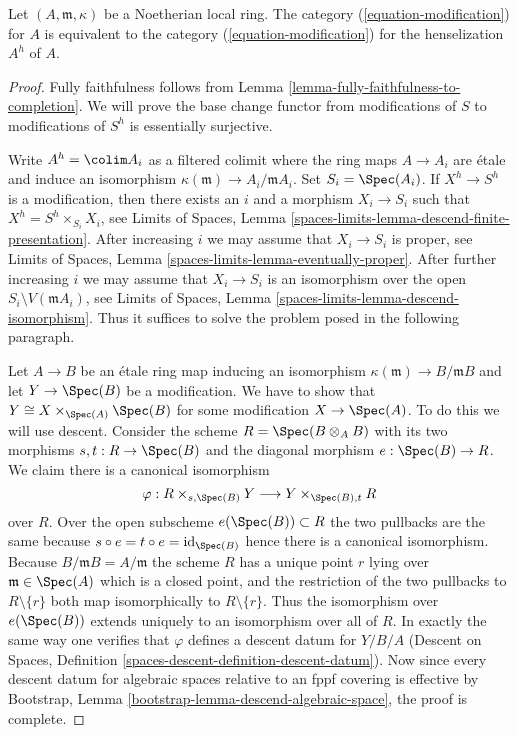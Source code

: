 \begin{lemma}
\label{lemma-henselian}
Let $(A, \mathfrak m, \kappa)$ be a Noetherian local ring.
The category (\ref{equation-modification}) for $A$
is equivalent to the category (\ref{equation-modification})
for the henselization $A^h$ of $A$.
\end{lemma}

\begin{proof}
Fully faithfulness follows from
Lemma \ref{lemma-fully-faithfulness-to-completion}.
We will prove the base change functor from modifications of $S$ to
modifications of $S^h$ is essentially surjective.

\medskip\noindent
Write $A^h = \colim A_i$ as a filtered colimit where the ring maps
$A \to A_i$ are \'etale and induce an isomorphism
$\kappa(\mathfrak m) \to A_i/\mathfrak m A_i$. Set $S_i = \Spec(A_i)$.
If $X^h \to S^h$ is a modification, then there exists an $i$ and
a morphism $X_i \to S_i$ such that $X^h = S^h \times_{S_i} X_i$, see
Limits of Spaces, Lemma \ref{spaces-limits-lemma-descend-finite-presentation}.
After increasing $i$ we may assume that $X_i \to S_i$ is
proper, see
Limits of Spaces, Lemma \ref{spaces-limits-lemma-eventually-proper}.
After further increasing $i$ we may assume that
$X_i \to S_i$ is an isomorphism over the open
$S_i \setminus V(\mathfrak m A_i)$, see
Limits of Spaces, Lemma \ref{spaces-limits-lemma-descend-isomorphism}.
Thus it suffices to solve the problem posed in the following paragraph.

\medskip\noindent
Let $A \to B$ be an \'etale ring map inducing an isomorphism
$\kappa(\mathfrak m) \to B/\mathfrak m B$ and let $Y \to \Spec(B)$
be a modification. We have to show that $Y \cong X \times_{\Spec(A)} \Spec(B)$
for some modification $X \to \Spec(A)$. To do this we will use descent.
Consider the scheme $R = \Spec(B \otimes_A B)$ with its two morphisms
$s, t : R \to \Spec(B)$ and the diagonal morphism $e : \Spec(B) \to R$.
We claim there is a canonical isomorphism
$$
\varphi :
R \times_{s, \Spec(B)} Y
\longrightarrow
Y \times_{\Spec(B), t} R
$$
over $R$. Over the open subscheme $e(\Spec(B)) \subset R$ the two
pullbacks are the same because $s \circ e = t \circ e = \text{id}_{\Spec(B)}$
hence there is a canonical isomorphism. Because
$B/\mathfrak m B = A/\mathfrak m$ the scheme $R$ has a unique
point $r$ lying over $\mathfrak m \in \Spec(A)$ which is a closed point,
and the restriction of the two pullbacks to $R \setminus \{r\}$ both map
isomorphically to $R \setminus \{r\}$. Thus the isomorphism over
$e(\Spec(B))$ extends uniquely to an isomorphism over all of $R$.
In exactly the same way one verifies that $\varphi$ defines a descent
datum for $Y/B/A$ (Descent on Spaces, Definition
\ref{spaces-descent-definition-descent-datum}). Now since every
descent datum for algebraic spaces relative to an fppf covering
is effective by Bootstrap, Lemma \ref{bootstrap-lemma-descend-algebraic-space},
the proof is complete.
\end{proof}

